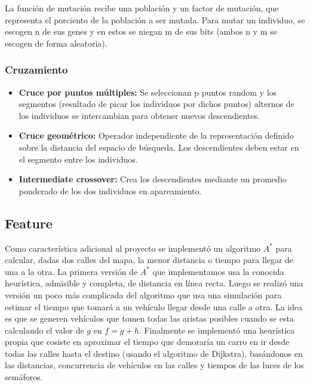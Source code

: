 \documentclass[twoside,twocolumn]{article} %
\begin{document}
		La funci\'on de mutaci\'on recibe una poblaci\'on y un factor de mutaci\'on, que representa el porciento de la poblaci\'on a ser mutada. Para mutar un individuo, se escogen n de sus genes y en estos se niegan m de sus bits (ambos n y m se escogen de forma aleatoria).
		
		\subsubsection{Cruzamiento}
		
		\begin{itemize}
			\item  \textbf{Cruce por puntos m\'ultiples:} Se seleccionan p puntos random y los segmentos (resultado de picar los individuos por dichos puntos) alternos de los individuos se intercambian para obtener nuevos descendientes.
			\item \textbf{Cruce geom\'etrico:} Operador independiente de la representación definido sobre la distancia del espacio de búsqueda. Los descendientes deben estar en el segmento entre los individuos.
			\item \textbf{Intermediate crossover:} Crea los descendientes mediante un promedio ponderado de los dos individuos en apareamiento.
		\end{itemize}
		
		\subsection{Feature}
		
		Como caracter\'istica adicional al proyecto se implement\'o	un algoritmo $A^{*}$ para calcular, dadas dos calles del mapa, la menor distancia o tiempo para llegar de una a la otra. La primera versi\'on de $A^*$ que implementamos usa la conocida heur\'istica, admisible y completa, de distancia en l\'inea recta. Luego se realiz\'o una versi\'on un poco m\'as complicada del algoritmo que usa una simulaci\'on para estimar el tiempo que tomar\'a a un veh\'iculo llegar desde una calle a otra. La idea es que se generen veh\'iculos que tomen todas las aristas posibles cuando se esta calculando el valor de $g$ en $f = g + h$. Finalmente se implement\'o una heur\'istica propia que cosiste en aproximar el tiempo que demorar\'ia un carro en ir desde todas las calles hasta el destino (usando el algoritmo de Dijkstra), bas\'andonos en las distancias, concurrencia de veh\'iculos en las calles y tiempos de las luces de los sem\'aforos.
	
	
\end{document}
